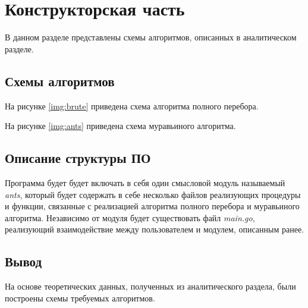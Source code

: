 \chapter{Конструкторская часть}

В данном разделе представлены схемы алгоритмов, описанных в аналитическом разделе.

\section{Схемы алгоритмов}

На рисунке \ref{img:brute} приведена схема алгоритма полного перебора.


\clearpage

На рисунке \ref{img:ants} приведена схема муравьиного алгоритма.


\clearpage


\section{Описание структуры ПО}
Программа будет будет включать в себя один смысловой модуль называемый \textit{ants}, который будет содержать в себе несколько файлов реализующих процедуры и функции, связанные с реализацией алгоритма полного перебора и муравьиного алгоритма. Независимо от модуля будет существовать файл \textit{main.go}, реализующий взаимодействие между пользователем и модулем, описанным ранее.

\section{Вывод}

На основе теоретических данных, полученных из аналитического раздела, были построены схемы требуемых алгоритмов.
